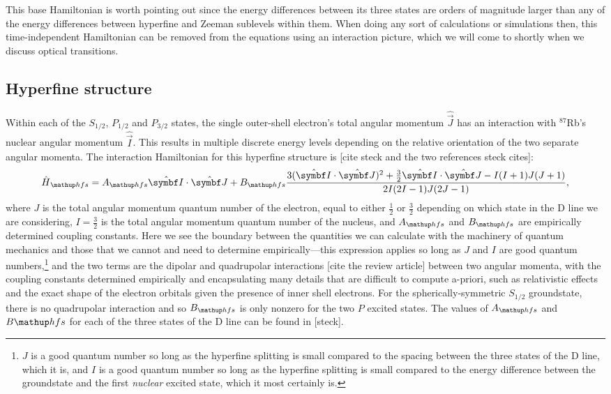 This base Hamiltonian is worth pointing out since the energy differences between its three states are orders of magnitude larger than any of the energy differences between hyperfine and Zeeman sublevels within them. When doing any sort of calculations or simulations then, this time-independent Hamiltonian can be removed from the equations using an interaction picture, which we will come to shortly when we discuss optical transitions. 

\subsection{Hyperfine structure}

Within each of the $S_{1/2}$, $P_{1/2}$ and $P_{3/2}$ states, the single outer-shell electron's total angular momentum $\hat {\vec J}$ has an interaction with $^{87}$Rb's nuclear angular momentum $\hat{\vec I}$. This results in multiple discrete energy levels depending on the relative orientation of the two separate angular momenta. The interaction Hamiltonian for this hyperfine structure is [cite steck and the two references steck cites]:
\begin{align}\label{eq:H_hfs}
\hat H_\up{hfs} = A_\up{hfs} \hat{\vec I} \cdot \hat {\vec J} + B_\up{hfs}\frac
{3(\hat{\vec I}\cdot\hat{\vec J})^2 + \frac32 \hat{\vec I}\cdot\hat{\vec J} - I(I + 1)J(J + 1)}
{2I(2I - 1)J(2J - 1)},
\end{align}
where $J$ is the total angular momentum quantum number of the electron, equal to either $\frac12$ or $\frac32$ depending on which state in the D line we are considering, $I=\frac32$ is the total angular momentum quantum number of the nucleus, and $A_\up{hfs}$ and $B_\up{hfs}$ are empirically determined coupling constants. Here we see the boundary between the quantities we can calculate with the machinery of quantum mechanics and those that we cannot and need to determine empirically---this expression applies so long as $J$ and $I$ are good quantum numbers,\footnote{$J$ is a good quantum number so long as the hyperfine splitting is small compared to the spacing between the three states of the D line, which it is, and $I$ is a good quantum number so long as the hyperfine splitting is small compared to the energy difference between the groundstate and the first \emph{nuclear} excited state, which it most certainly is.} and the two terms are the dipolar and quadrupolar interactions [cite the review article] between two angular momenta, with the coupling constants determined empirically and encapsulating many details that are difficult to compute a-priori, such as relativistic effects and the exact shape of the electron orbitals given the presence of inner shell electrons. For the spherically-symmetric $S_{1/2}$ groundstate, there is no quadrupolar interaction and so $B_\up{hfs}$ is only nonzero for the two $P$ excited states. The values of $A_\up{hfs}$ and $B\up{hfs}$ for each of the three states of the D line can be found in [steck].

